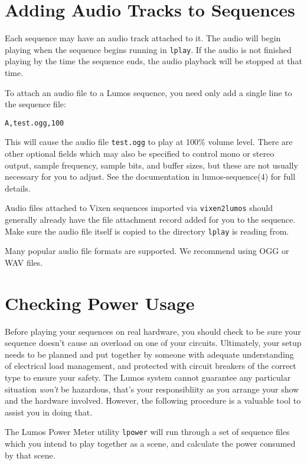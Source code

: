\documentclass{article}
\begin{document}
\section{Adding Audio Tracks to Sequences}
Each sequence may have an audio track attached to it.  The audio will begin playing
when the sequence begins running in {\tt lplay}.  If the audio is not finished playing
by the time the sequence ends, the audio playback will be stopped at that time.

To attach an audio file to a Lumos sequence, you need only add a single line to 
the sequence file:

\begin{verbatim}
A,test.ogg,100
\end{verbatim}

This will cause the audio file {\tt test.ogg} to play at 100\% volume level.  There are
other optional fields which may also be specified to control mono or stereo output,
sample frequency, sample bits, and buffer sizes, but these are not usually necessary
for you to adjust.  See the documentation in lumos-sequence(4) for full details.

Audio files attached to Vixen sequences imported via {\tt vixen2lumos} should generally
already have the file attachment record added for you to the sequence.  Make sure the
audio file itself is copied to the directory {\tt lplay} is reading from.

Many popular audio file formats are supported.  We recommend using OGG or WAV files.

\section{Checking Power Usage}
Before playing your sequences on real hardware, you should check to be sure
your sequence doesn't cause an overload on one of your circuits.  Ultimately,
your setup needs to be planned and put together by someone with adequate
understanding of electrical load management, and protected with circuit breakers
of the correct type to ensure your safety.  The Lumos system cannot guarantee
any particular situation \emph{won't} be hazardous, that's your responsibliity
as you arrange your show and the hardware involved.  However, the following 
procedure is a valuable tool to assist you in doing that.

The Lumos Power Meter utility {\tt lpower} will run through a set of sequence
files which you intend to play together as a scene, and calculate the power
consumed by that scene.  
\end{document}
